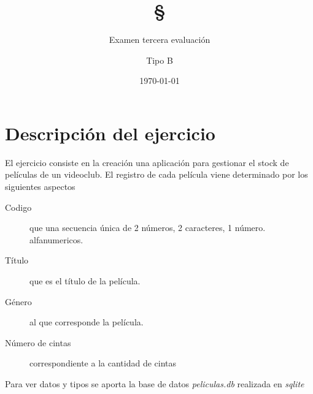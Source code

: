 \documentclass[4paper]{article}
\author{Examen tercera evaluación}
\author{Tipo B}
\title{\textbf{\S}}
\date{\today}
\begin{document}
\maketitle 
\section*{Descripción del ejercicio}
El ejercicio consiste en la creación una aplicación para gestionar el stock de películas de un videoclub. El registro de cada película viene determinado por los siguientes aspectos
\begin{description}
\item[Codigo] que una secuencia única de 2 números, 2 caracteres, 1 número. alfanumericos.
\item[Título] que es el título de la película.
\item[Género] al que corresponde la película.
\item[Número de cintas] correspondiente a la cantidad de cintas
\end{description}
Para ver datos y tipos se aporta la base de datos \emph{peliculas.db} realizada en \emph{sqlite}
\end{document}
